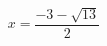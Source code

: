 \documentclass[preview]{standalone}
\begin{document}
\begin{align*}
x = \dfrac{-3 - \sqrt{13} }{2}
\end{align*}
\end{document}
